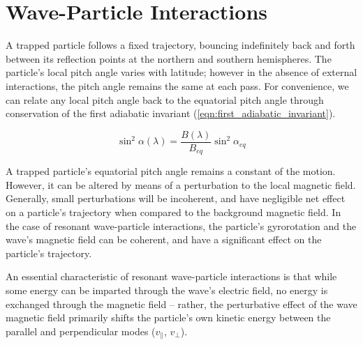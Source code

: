\section{Wave-Particle Interactions}

A trapped particle follows a fixed trajectory, bouncing indefinitely back and forth between its reflection points at the northern and southern hemispheres. The particle's local pitch angle varies with latitude; however in the absence of external interactions, the pitch angle remains the same at each pass. For convenience, we can relate any local pitch angle back to the equatorial pitch angle through conservation of the first adiabatic invariant (\ref{eqn:first_adiabatic_invariant}).

\begin{equation}
\sin^2 \alpha (\lambda) = \frac{B(\lambda)}{B_{eq}} \sin^2 \alpha_{eq}
\end{equation}

A trapped particle's equatorial pitch angle remains a constant of the motion. However, it can be altered by means of a perturbation to the local magnetic field. Generally, small perturbations will be incoherent, and have negligible net effect on a particle's trajectory when compared to the background magnetic field. In the case of resonant wave-particle interactions, the particle's gyrorotation and the wave's magnetic field can be coherent, and have a significant effect on the particle's trajectory.

An essential characteristic of resonant wave-particle interactions is that while some energy can be imparted through the wave's electric field, no energy is exchanged through the magnetic field -- rather, the perturbative effect of the wave magnetic field primarily shifts the particle's own kinetic energy between the parallel and perpendicular modes ($v_\parallel$, $v_\perp$). 

